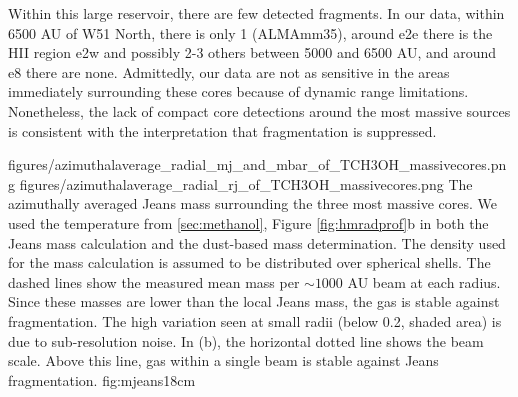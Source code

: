 \documentclass{emulateapj}
\begin{document}


Within this large reservoir, there are few detected fragments.  In our data,
within 6500 AU of W51 North, there is only 1 (ALMAmm35), around e2e there is
the HII region e2w and possibly 2-3 others between 5000 and 6500 AU, and around
e8 there are none.  Admittedly, our data are not as sensitive in the areas
immediately surrounding these cores because of dynamic range limitations.
Nonetheless, the lack of compact core detections around the most massive
sources is consistent with the interpretation that fragmentation is suppressed.



\FigureTwo
{figures/azimuthalaverage_radial_mj_and_mbar_of_TCH3OH_massivecores.png}
{figures/azimuthalaverage_radial_rj_of_TCH3OH_massivecores.png}
{The azimuthally averaged Jeans mass surrounding the
three most massive cores.  We used the \methanol temperature from
\ref{sec:methanol}, Figure \ref{fig:hmradprof}b in both the Jeans mass
calculation and the dust-based mass determination.
The density used for the mass calculation is assumed to be distributed
over spherical shells.  The dashed lines show the measured mean mass per
$\sim1000$ AU beam at each radius.  Since these masses are lower than
the local Jeans mass, the gas is stable against fragmentation.
The high variation seen at small radii (below 0.2\arcsec, shaded area) is due
to sub-resolution noise.
In (b), the horizontal dotted line shows the beam scale. Above this line,
gas within a single beam is stable against Jeans fragmentation.
}
{fig:mjeans}{1}{8cm}
\end{document}
